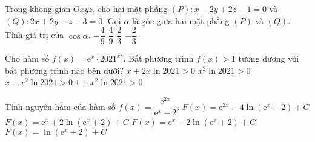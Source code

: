 \begin{ex}%
	Trong không gian $Oxyz$, cho hai mặt phẳng $(P)\colon x-2y+2z-1=0$ và $(Q)\colon2x+2y-z-3=0$. Gọi $\alpha$ là góc giữa hai mặt phẳng $(P)$ và $(Q)$. Tính giá trị của $\cos\alpha$.
	\choice
	{$-\dfrac{4}{9}$}
	{\True $\dfrac{4}{9}$}
	{$\dfrac{2}{3}$}
	{$-\dfrac{2}{3}$}
\end{ex}
\begin{ex}%
	Cho hàm số $f(x)=\mathrm{e}^x\cdot2021^{x^2}$. Bất phương trình $f(x)>1$ tương đương với bất phương trình nào bên dưới?
	\choice
	{$x+2x\ln2021>0$}
	{$x^2\ln2021>0$}
	{\True $x+x^2\ln2021>0$}
	{$1+x^2\ln2021>0$}
\end{ex}
\begin{ex}%
	Tính nguyên hàm của hàm số $f(x)=\dfrac{\mathrm{e}^{2x}}{\mathrm{e}^x+2}$.
	\choice
	{$F(x)=\mathrm{e}^{2x}-4\ln\left(\mathrm{e}^x+2\right)+C$}
	{$F(x)=\mathrm{e}^x+2\ln\left(\mathrm{e}^x+2\right)+C$}
	{\True $F(x)=\mathrm{e}^x-2\ln\left(\mathrm{e}^x+2\right)+C$}
	{$F(x)=\ln\left(\mathrm{e}^x+2\right)+C$}
\end{ex}
